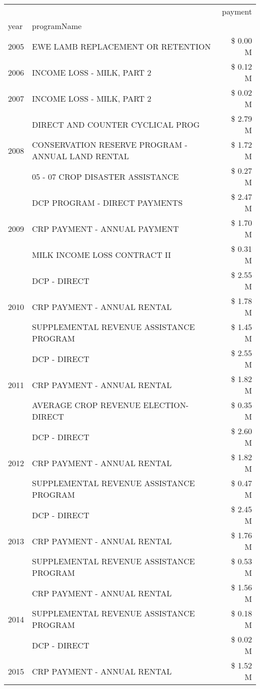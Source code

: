 \begin{tabular}{llr}
\toprule
 &  & payment \\
year & programName &  \\
\midrule
2005 & EWE LAMB REPLACEMENT OR RETENTION & \$ 0.00 M \\
\cline{1-3}
2006 & INCOME LOSS - MILK, PART 2 & \$ 0.12 M \\
\cline{1-3}
2007 & INCOME LOSS - MILK, PART 2 & \$ 0.02 M \\
\cline{1-3}
\multirow[t]{3}{*}{2008} & DIRECT AND COUNTER CYCLICAL PROG & \$ 2.79 M \\
 & CONSERVATION RESERVE PROGRAM - ANNUAL LAND RENTAL & \$ 1.72 M \\
 & 05 - 07 CROP DISASTER ASSISTANCE & \$ 0.27 M \\
\cline{1-3}
\multirow[t]{3}{*}{2009} & DCP PROGRAM - DIRECT PAYMENTS & \$ 2.47 M \\
 & CRP PAYMENT - ANNUAL PAYMENT & \$ 1.70 M \\
 & MILK INCOME LOSS CONTRACT II & \$ 0.31 M \\
\cline{1-3}
\multirow[t]{3}{*}{2010} & DCP - DIRECT & \$ 2.55 M \\
 & CRP PAYMENT - ANNUAL RENTAL & \$ 1.78 M \\
 & SUPPLEMENTAL REVENUE ASSISTANCE PROGRAM & \$ 1.45 M \\
\cline{1-3}
\multirow[t]{3}{*}{2011} & DCP - DIRECT & \$ 2.55 M \\
 & CRP PAYMENT - ANNUAL RENTAL & \$ 1.82 M \\
 & AVERAGE CROP REVENUE ELECTION-DIRECT & \$ 0.35 M \\
\cline{1-3}
\multirow[t]{3}{*}{2012} & DCP - DIRECT & \$ 2.60 M \\
 & CRP PAYMENT - ANNUAL RENTAL & \$ 1.82 M \\
 & SUPPLEMENTAL REVENUE ASSISTANCE PROGRAM & \$ 0.47 M \\
\cline{1-3}
\multirow[t]{3}{*}{2013} & DCP - DIRECT & \$ 2.45 M \\
 & CRP PAYMENT - ANNUAL RENTAL & \$ 1.76 M \\
 & SUPPLEMENTAL REVENUE ASSISTANCE PROGRAM & \$ 0.53 M \\
\cline{1-3}
\multirow[t]{3}{*}{2014} & CRP PAYMENT - ANNUAL RENTAL & \$ 1.56 M \\
 & SUPPLEMENTAL REVENUE ASSISTANCE PROGRAM & \$ 0.18 M \\
 & DCP - DIRECT & \$ 0.02 M \\
\cline{1-3}
\multirow[t]{3}{*}{2015} & CRP PAYMENT - ANNUAL RENTAL & \$ 1.52 M \\

\end{tabular}
